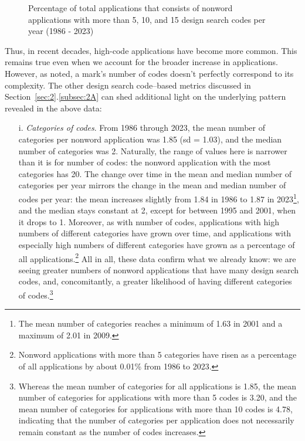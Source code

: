 \documentclass[letterpaper, 11pt, oneside]{article}
\begin{document}
\begin{figure}[H]
\centering

\caption{\label{fig:6} Percentage of total applications that consists of nonword applications with more than 5, 10, and 15 design search codes per year (1986 - 2023)}
\end{figure}

Thus, in recent decades, high-code applications have become more common. This remains true even when we account for the broader increase in applications. However, as noted, a mark's number of codes doesn't perfectly correspond to its complexity. The other design search code–based metrics discussed in Section~\ref{sec:2}.\ref{subsec:2A} can shed additional light on the underlying pattern revealed in the above data:

\begin{enumerate}

\item[i.] \textit{Categories of codes}. From 1986 through 2023, the mean number of categories per nonword application was 1.85 (sd = 1.03), and the median number of categories was 2. Naturally, the range of values here is narrower than it is for number of codes: the nonword application with the most categories has 20. The change over time in the mean and median number of categories per year mirrors the change in the mean and median number of codes per year: the mean increases slightly from 1.84 in 1986 to 1.87 in 2023\footnote{The mean number of categories reaches a minimum of 1.63 in 2001 and a maximum of 2.01 in 2009.}, and the median stays constant at 2, except for between 1995 and 2001, when it drops to 1. Moreover, as with number of codes, applications with high numbers of different categories have grown over time, and applications with especially high numbers of different categories have grown as a percentage of all applications.\footnote{Nonword applications with more than 5 categories have risen as a percentage of all applications by about 0.01\% from 1986 to 2023.} All in all, these data confirm what we already know: we are seeing greater numbers of nonword applications that have many design search codes, and, concomitantly, a greater likelihood of having different categories of codes.\footnote{Whereas the mean number of categories for all applications is 1.85, the mean number of categories for applications with more than 5 codes is 3.20, and the mean number of categories for applications with more than 10 codes is 4.78, indicating that the number of categories per application does not necessarily remain constant as the number of codes increases.}


\end{enumerate}
\end{document}
